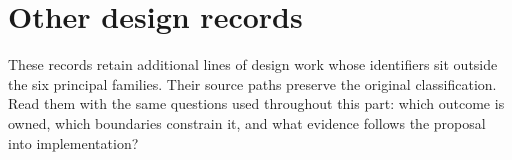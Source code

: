 \chapter*{Other design records}

These records retain additional lines of design work whose identifiers sit outside the six principal families. Their source paths preserve the original classification. Read them with the same questions used throughout this part: which outcome is owned, which boundaries constrain it, and what evidence follows the proposal into implementation?

%
%
%
%
%
%
%
%
%
%
